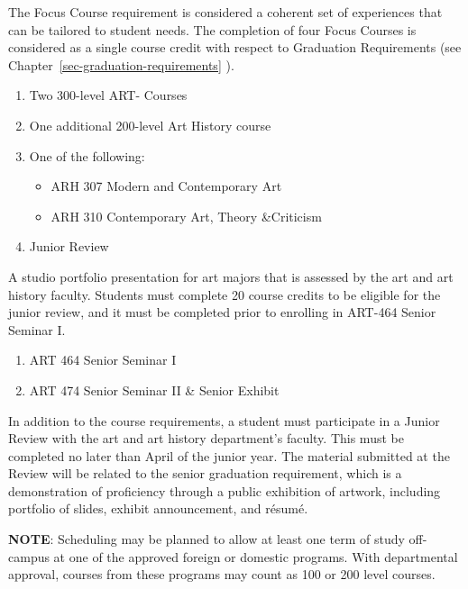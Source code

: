 \documentclass[
  letterpaper,
]{scrbook}
\providecommand{\tightlist}{%
  \setlength{\itemsep}{0pt}\setlength{\parskip}{0pt}}
\begin{document}
The Focus Course requirement is considered a coherent set of experiences
that can be tailored to student needs. The completion of four Focus
Courses is considered as a single course credit with respect to
Graduation Requirements (see Chapter~\ref{sec-graduation-requirements}
).

\begin{enumerate}
\def\labelenumi{\arabic{enumi}.}
\setcounter{enumi}{3}
\tightlist
\item
  Two 300-level ART- Courses
\item
  One additional 200-level Art History course
\item
  One of the following:

  \begin{itemize}
  \tightlist
  \item
    ARH 307 Modern and Contemporary Art
  \item
    ARH 310 Contemporary Art, Theory \&Criticism
  \end{itemize}
\item
  Junior Review
\end{enumerate}

A studio portfolio presentation for art majors that is assessed by the
art and art history faculty. Students must complete 20 course credits to
be eligible for the junior review, and it must be completed prior to
enrolling in ART-464 Senior Seminar I.

\begin{enumerate}
\def\labelenumi{\arabic{enumi}.}
\setcounter{enumi}{7}
\tightlist
\item
  ART 464 Senior Seminar I
\item
  ART 474 Senior Seminar II \& Senior Exhibit
\end{enumerate}

In addition to the course requirements, a student must participate in a
Junior Review with the art and art history department's faculty. This
must be completed no later than April of the junior year. The material
submitted at the Review will be related to the senior graduation
requirement, which is a demonstration of proficiency through a public
exhibition of artwork, including portfolio of slides, exhibit
announcement, and résumé.

\textbf{NOTE}: Scheduling may be planned to allow at least one term of
study off-campus at one of the approved foreign or domestic programs.
With departmental approval, courses from these programs may count as 100
or 200 level courses.
\end{document}
